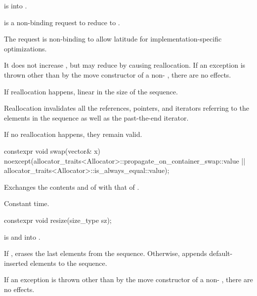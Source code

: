 \begin{itemdescr}
\pnum
\expects
{} is  into .

\pnum
\effects
{} is a non-binding request to reduce
 to .
\begin{note}
The request is non-binding to allow latitude for
implementation-specific optimizations.
\end{note}
It does not increase , but may reduce 
by causing reallocation.
If an exception is thrown other than by the move constructor
of a non- , there are no effects.

\pnum
\complexity
If reallocation happens,
linear in the size of the sequence.

\pnum
\remarks
Reallocation invalidates all the references, pointers, and iterators
referring to the elements in the sequence as well as the past-the-end iterator.
\begin{note}
If no reallocation happens, they remain valid.
\end{note}
\end{itemdescr}

%
\begin{itemdecl}
constexpr void swap(vector& x)
  noexcept(allocator_traits<Allocator>::propagate_on_container_swap::value ||
           allocator_traits<Allocator>::is_always_equal::value);
\end{itemdecl}

\begin{itemdescr}
\pnum
\effects
Exchanges the contents and
of
with that of .

\pnum
\complexity
Constant time.
\end{itemdescr}

%
\begin{itemdecl}
constexpr void resize(size_type sz);
\end{itemdecl}

\begin{itemdescr}
\pnum
\expects
{} is
 and  into .

\pnum
\effects
If , erases the last  elements
from the sequence. Otherwise,
appends  default-inserted elements to the sequence.

\pnum
\remarks
If an exception is thrown other than by the move constructor of a non-
, there are no effects.
\end{itemdescr}

